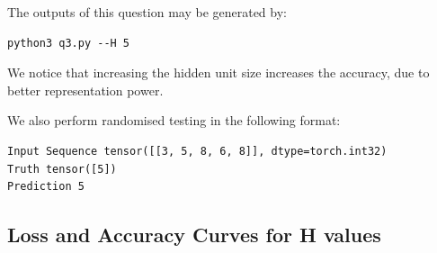 The outputs of this question may be generated by:

\begin{lstlisting}
python3 q3.py --H 5
\end{lstlisting} 

We notice that increasing the hidden unit size increases the accuracy, due to better representation power.

We also perform randomised testing in the following format:\\
\begin{lstlisting}
Input Sequence tensor([[3, 5, 8, 6, 8]], dtype=torch.int32)
Truth tensor([5])
Prediction 5
\end{lstlisting}

\subsection{Loss and Accuracy Curves for H values}

